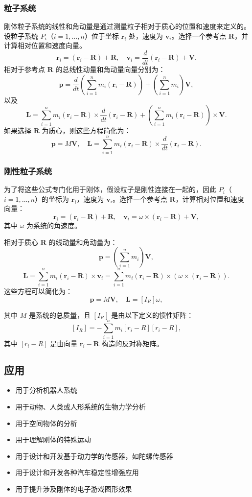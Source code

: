 \subsubsection{粒子系统}

刚体粒子系统的线性和角动量是通过测量粒子相对于质心的位置和速度来定义的。设粒子系统 \( P_i \)（\( i = 1, \dots, n \)）位于坐标 \( \mathbf{r}_i \) 处，速度为 \( \mathbf{v}_i \)。选择一个参考点 \( \mathbf{R} \)，并计算相对位置和速度向量。
\[
\mathbf{r}_i = \left(\mathbf{r}_i - \mathbf{R}\right) + \mathbf{R}, \quad \mathbf{v}_i = \frac{d}{dt}(\mathbf{r}_i - \mathbf{R}) + \mathbf{V}.~
\]
相对于参考点 \( \mathbf{R} \) 的总线性动量和角动量向量分别为：
\[
\mathbf{p} = \frac{d}{dt} \left( \sum_{i=1}^{n} m_i \left( \mathbf{r}_i - \mathbf{R} \right) \right) + \left( \sum_{i=1}^{n} m_i \right) \mathbf{V},~
\]
以及
\[
\mathbf{L} = \sum_{i=1}^{n} m_i \left( \mathbf{r}_i - \mathbf{R} \right) \times \frac{d}{dt} \left( \mathbf{r}_i - \mathbf{R} \right) + \left( \sum_{i=1}^{n} m_i \left( \mathbf{r}_i - \mathbf{R} \right) \right) \times \mathbf{V}.~
\]
如果选择 \( \mathbf{R} \) 为质心，则这些方程简化为：
\[
\mathbf{p} = M \mathbf{V}, \quad \mathbf{L} = \sum_{i=1}^{n} m_i \left( \mathbf{r}_i - \mathbf{R} \right) \times \frac{d}{dt} \left( \mathbf{r}_i - \mathbf{R} \right).~
\]
\subsubsection{刚性粒子系统}
为了将这些公式专门化用于刚体，假设粒子是刚性连接在一起的，因此 \( P_i \)（\( i = 1, \dots, n \)）的坐标为 \( \mathbf{r}_i \)，速度为 \( \mathbf{v}_i \)。选择一个参考点 \( \mathbf{R} \)，计算相对位置和速度向量：
\[
\mathbf{r}_i = (\mathbf{r}_i - \mathbf{R}) + \mathbf{R},
\quad
\mathbf{v}_i = \omega \times (\mathbf{r}_i - \mathbf{R}) + \mathbf{V},~
\]
其中 \( \omega \) 为系统的角速度。

相对于质心 \( \mathbf{R} \) 的线动量和角动量为：
\[
\mathbf{p} = \left( \sum_{i=1}^{n} m_i \right) \mathbf{V},~
\]
\[
\mathbf{L} = \sum_{i=1}^{n} m_i (\mathbf{r}_i - \mathbf{R}) \times \mathbf{v}_i = \sum_{i=1}^{n} m_i (\mathbf{r}_i - \mathbf{R}) \times (\omega \times (\mathbf{r}_i - \mathbf{R})).~
\]
这些方程可以简化为：
\[
\mathbf{p} = M \mathbf{V},
\quad
\mathbf{L} = [I_R] \omega,~
\]

其中 \( M \) 是系统的总质量，且 \( [I_R] \) 是由以下定义的惯性矩阵：
\[
[I_R] = -\sum_{i=1}^{n} m_i [r_i - R][r_i - R],~
\]
其中 \( [r_i - R] \) 是由向量 \( \mathbf{r}_i - \mathbf{R} \) 构造的反对称矩阵。
\subsection{应用}
\begin{itemize}
\item 用于分析机器人系统
\item 用于动物、人类或人形系统的生物力学分析
\item 用于空间物体的分析
\item 用于理解刚体的特殊运动
\item 用于设计和开发基于动力学的传感器，如陀螺传感器
\item 用于设计和开发各种汽车稳定性增强应用
\item 用于提升涉及刚体的电子游戏图形效果
\end{itemize}
